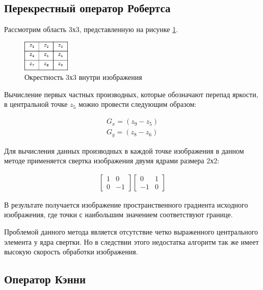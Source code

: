\subsection{Перекрестный оператор Робертса}

Рассмотрим область 3х3, представленную на рисунке \ref{fig:roberst}.

\begin{figure}[!h]
	\centering
	\includegraphics[width=0.2\textwidth,keepaspectratio]{figures/ru/roberts}
	\caption{Окрестность 3х3 внутри изображения}
	\label{fig:roberst}
\end{figure}

Вычисление первых частных производных, которые обозначают перепад яркости, в центральной точке $z_5$ можно провести следующим образом:

\begin{eqnarray}\label{eq:roberts-eq}
G_x = (z_9 - z_5) \\
G_y = (z_8 - z_6)
\end{eqnarray}

Для вычисления данных производных в каждой точке изображения в данном методе\cite{Roberts} применяется свертка изображения двумя ядрами размера 2х2:

\begin{eqnarray}\label{eq:roberts-matrixs}
\begin{bmatrix}
1 & 0\\
0 & -1
\end{bmatrix} 
\begin{bmatrix}
0 & 1\\
-1 & 0
\end{bmatrix}
\end{eqnarray}

В результате получается изображение пространственного градиента исходного изображения, где точки с наибольшим значением соответствуют границе.

Проблемой данного метода является отсутствие четко выраженного центрального элемента у ядра свертки. Но в следствии этого недостатка алгоритм так же имеет высокую скорость обработки изображения.

\subsection{Оператор Кэнни}


